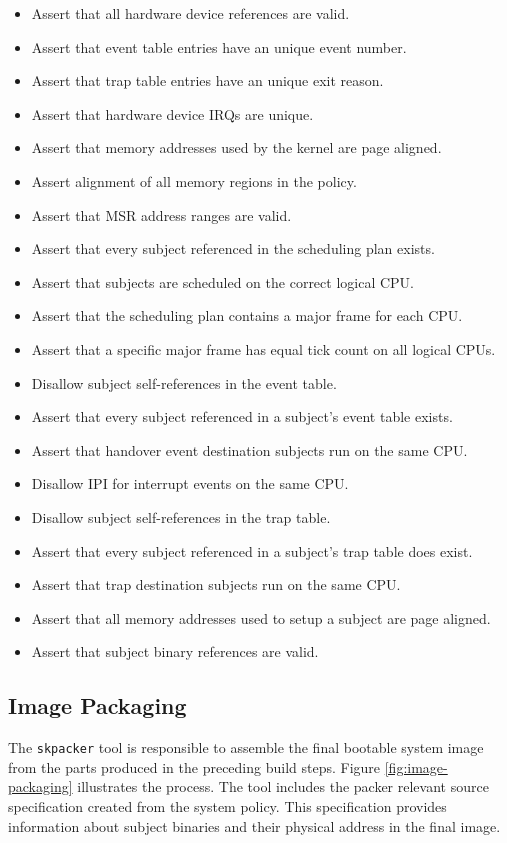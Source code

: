 \begin{itemize}
	\item Assert that all hardware device references are valid.
	\item Assert that event table entries have an unique event number.
	\item Assert that trap table entries have an unique exit reason.
	\item Assert that hardware device IRQs are unique.
	\item Assert that memory addresses used by the kernel are page aligned.
	\item Assert alignment of all memory regions in the policy.
	\item Assert that MSR address ranges are valid.
	\item Assert that every subject referenced in the scheduling plan exists.
	\item Assert that subjects are scheduled on the correct logical CPU.
	\item Assert that the scheduling plan contains a major frame for each CPU.
	\item Assert that a specific major frame has equal tick count on all logical
		CPUs.
	\item Disallow subject self-references in the event table.
	\item Assert that every subject referenced in a subject's event table exists.
	\item Assert that handover event destination subjects run on the same CPU.
	\item Disallow IPI for interrupt events on the same CPU.
	\item Disallow subject self-references in the trap table.
	\item Assert that every subject referenced in a subject's trap table does
		exist.
	\item Assert that trap destination subjects run on the same CPU.
	\item Assert that all memory addresses used to setup a subject are page
		aligned.
	\item Assert that subject binary references are valid.
\end{itemize}

\subsection{Image Packaging}\label{subsec:image-packaging}
The \texttt{skpacker} tool is responsible to assemble the final bootable system
image from the parts produced in the preceding build steps. Figure
\ref{fig:image-packaging} illustrates the process. The tool includes the packer
relevant source specification created from the system policy. This specification
provides information about subject binaries and their physical address in the
final image.

